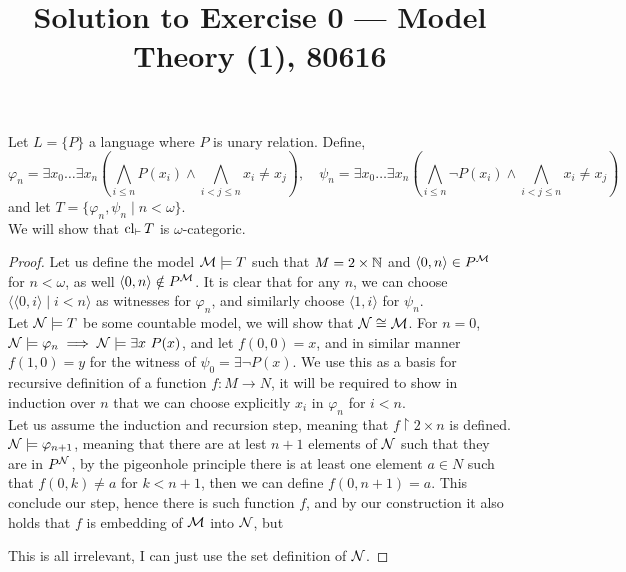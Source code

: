 
\title{Solution to Exercise 0 --- Model Theory (1), 80616}


\maketitle
\maketitleprint[yellow]

\question{}
Let $L = \{ P \}$ a language where $P$ is unary relation.
Define,
\[
	\varphi_n
	= \exists x_0 \ldots \exists x_n \left( \bigwedge_{i \le n} P(x_i) \land \bigwedge_{i < j \le n} x_i \ne x_j \right),
	\quad
	\psi_n
	= \exists x_0 \ldots \exists x_n \left( \bigwedge_{i \le n} \lnot P(x_i) \land \bigwedge_{i < j \le n} x_i \ne x_j \right)
\]
and let $T = \{ \varphi_n, \psi_n \mid n < \omega \}$. \\
We will show that $\operatorname{cl}_{\vdash} T$ is $\omega$-categoric.
\begin{proof}
	Let us define the model $\mathcal{M} \models T$ such that $M = 2 \times \mathbb{N}$ and $\langle 0, n \rangle \in P^{\mathcal{M}}$ for $n < \omega$, as well $\langle 0, n \rangle \notin P^{\mathcal{M}}$.
	It is clear that for any $n$, we can choose $\langle \langle 0, i \rangle \mid i < n \rangle$ as witnesses for $\varphi_n$, and similarly choose $\langle 1, i \rangle$ for $\psi_n$. \\
	Let $\mathcal{N} \models T$ be some countable model, we will show that $\mathcal{N} \cong \mathcal{M}$.
	For $n = 0$, $\mathcal{N} \models \varphi_n \implies \mathcal{N} \models \exists x\ P(x)$, and let $f(0, 0) = x$, and in similar manner $f(1, 0) = y$ for the witness of $\psi_0 = \exists \lnot P(x)$.
	We use this as a basis for recursive definition of a function $f : M \to N$, it will be required to show in induction over $n$ that we can choose explicitly $x_i$ in $\varphi_n$ for $i < n$. \\
	Let us assume the induction and recursion step, meaning that $f \restriction 2 \times n$ is defined.
	$\mathcal{N} \models \varphi_{n + 1}$, meaning that there are at lest $n + 1$ elements of $\mathcal{N}$ such that they are in $P^{\mathcal{N}}$,
	by the pigeonhole principle there is at least one element $a \in N$ such that $f(0, k) \ne a$ for $k < n + 1$, then we can define $f(0, n + 1) = a$.
	This conclude our step, hence there is such function $f$, and by our construction it also holds that $f$ is embedding of $\mathcal{M}$ into $\mathcal{N}$, but 

	This is all irrelevant, I can just use the set definition of $\mathcal{N}$.
\end{proof}

